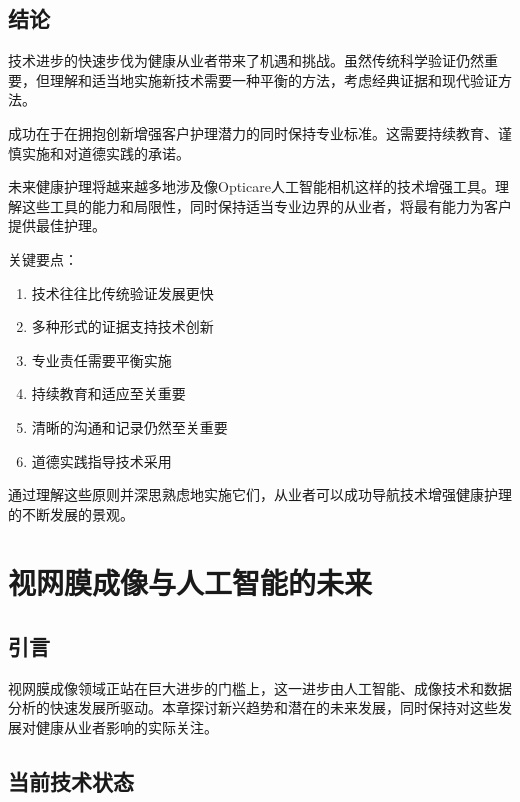 \documentclass[
  Letterpaper,
]{scrbook}
\providecommand{\tightlist}{%
  \setlength{\itemsep}{0pt}\setlength{\parskip}{0pt}}\usepackage{longtable,booktabs,array}
\begin{document}
\section{结论}\label{ux7ed3ux8bba-2}

技术进步的快速步伐为健康从业者带来了机遇和挑战。虽然传统科学验证仍然重要，但理解和适当地实施新技术需要一种平衡的方法，考虑经典证据和现代验证方法。

成功在于在拥抱创新增强客户护理潜力的同时保持专业标准。这需要持续教育、谨慎实施和对道德实践的承诺。

未来健康护理将越来越多地涉及像Opticare人工智能相机这样的技术增强工具。理解这些工具的能力和局限性，同时保持适当专业边界的从业者，将最有能力为客户提供最佳护理。

关键要点：

\begin{enumerate}
\def\labelenumi{\arabic{enumi}.}
\tightlist
\item
  技术往往比传统验证发展更快
\item
  多种形式的证据支持技术创新
\item
  专业责任需要平衡实施
\item
  持续教育和适应至关重要
\item
  清晰的沟通和记录仍然至关重要
\item
  道德实践指导技术采用
\end{enumerate}

通过理解这些原则并深思熟虑地实施它们，从业者可以成功导航技术增强健康护理的不断发展的景观。


\chapter{视网膜成像与人工智能的未来}\label{ux89c6ux7f51ux819cux6210ux50cfux4e0eux4ebaux5de5ux667aux80fdux7684ux672aux6765}

\section{引言}\label{ux5f15ux8a00-1}

视网膜成像领域正站在巨大进步的门槛上，这一进步由人工智能、成像技术和数据分析的快速发展所驱动。本章探讨新兴趋势和潜在的未来发展，同时保持对这些发展对健康从业者影响的实际关注。

\section{当前技术状态}\label{ux5f53ux524dux6280ux672fux72b6ux6001}
\end{document}

